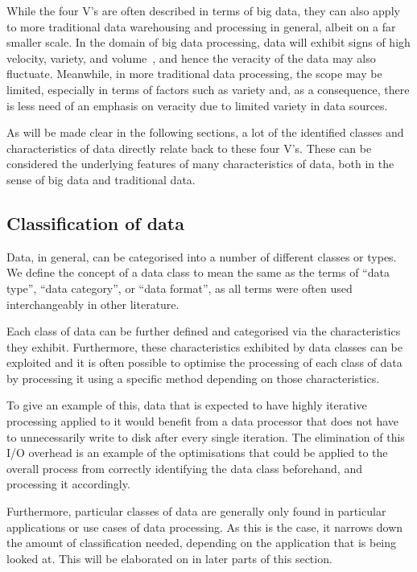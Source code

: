 While the four V's are often described in terms of big data, they can also apply to more traditional data warehousing
and processing in general, albeit on a far smaller scale. In the domain of big data processing, data will exhibit signs
of high velocity, variety, and volume~\cite{beyer2011gartner}, and hence the veracity of the data may also fluctuate.
Meanwhile, in more traditional data processing, the scope may be limited, especially in terms of factors such as variety
and, as a consequence, there is less need of an emphasis on veracity due to limited variety in data sources.

As will be made clear in the following sections, a lot of the identified classes and characteristics of data directly
relate back to these four V's. These can be considered the underlying features of many characteristics of data, both in
the sense of big data and traditional data.



\subsection{Classification of data} %
\label{sub:data_classification}

Data, in general, can be categorised into a number of different classes or types. We define the concept of a data class
to mean the same as the terms of ``data type'', ``data category'', or ``data format'', as all terms were often used
interchangeably in other literature.

Each class of data can be further defined and categorised via the characteristics they exhibit. Furthermore, these
characteristics exhibited by data classes can be exploited and it is often possible to optimise the processing of each
class of data by processing it using a specific method depending on those characteristics.

To give an example of this, data that is expected to have highly iterative processing applied to it would benefit from a
data processor that does not have to unnecessarily write to disk after every single iteration. The elimination of this
I/O overhead is an example of the optimisations that could be applied to the overall process from correctly identifying
the data class beforehand, and processing it accordingly.

Furthermore, particular classes of data are generally only found in particular applications or use cases of data
processing. As this is the case, it narrows down the amount of classification needed, depending on the application that
is being looked at. This will be elaborated on in later parts of this section.

